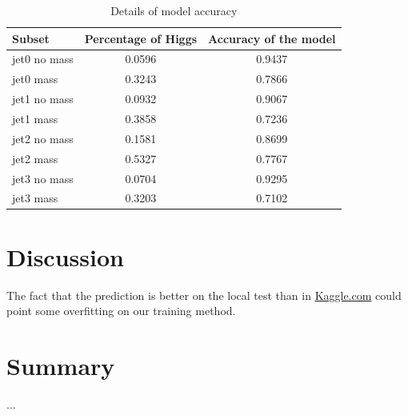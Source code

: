\documentclass[10pt,conference,compsocconf]{IEEEtran}
\begin{document}
\begin{table}[htbp]
  \centering
  \begin{tabular}[c]{| l| | c | c |}
    \hline
    Subset 	& Percentage of Higgs &Accuracy of the model \\
    \hline \hline
    jet0 no mass 			& 0.0596		& 0.9437		\\
    jet0 mass 				& 0.3243		& 0.7866		\\
    jet1 no mass				& 0.0932		& 0.9067 		\\
    jet1 mass				& 0.3858	 	& 0.7236 		\\
    jet2 no mass				& 0.1581		& 0.8699		\\
    jet2 mass				& 0.5327		& 0.7767		\\
    jet3 no mass				& 0.0704		& 0.9295		\\
    jet3 mass				& 0.3203		& 0.7102		\\
    \hline
  \end{tabular}
  \caption{Details of model accuracy}
  \label{tab:details}
\end{table}


\section{Discussion}
The fact that the prediction is better on the local test than in {\color{blue}\href{https://www.kaggle.com}{Kaggle.com}} could point some overfitting on our training method.


\section{Summary}

...




\end{document}
